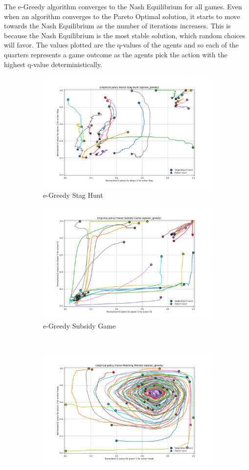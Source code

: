 \documentclass[12pt,letterpaper, onecolumn]{exam}
\begin{document}
The e-Greedy algorithm converges to the Nash Equilibrium for all games. Even when an algorithm converges to the Pareto Optimal solution, it starts to move towards the Nash Equilibrium
as the number of iterations increases. This is because the Nash Equilibrium is the most stable solution, which random choices will favor. The values plotted are the q-values of the agents
and so each of the quarters represents a game outcome as the agents pick the action with the highest q-value deterministically.

\begin{figure}
    \begin{subfigure}{.5\textwidth}
      \centering
      \includegraphics[width=.6\linewidth]{plots/replicator_trajectoreis_Stag Hunt_epsilon_greedy.png}
      \caption{e-Greedy Stag Hunt}
      \label{fig:sfigesh}
    \end{subfigure}%
    \begin{subfigure}{.5\textwidth}
      \centering
      \includegraphics[width=.6\linewidth]{plots/replicator_trajectoreis_Subsidy Game_epsilon_greedy.png}
      \caption{e-Greedy Subsidy Game}
      \label{fig:sfigesg}
    \end{subfigure}\\
    \begin{subfigure}{.5\textwidth}
      \centering
      \includegraphics[width=.6\linewidth]{plots/replicator_trajectoreis_Matching Pennies_epsilon_greedy.png}

\end{subfigure}
\end{figure}
\end{document}
